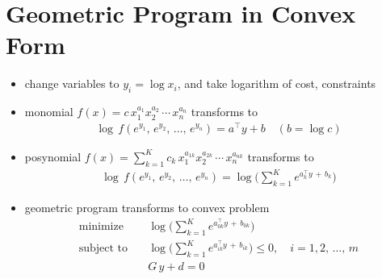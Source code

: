 \documentclass[11pt]{extarticle}
\newcommand{\ds}{\displaystyle}
\theoremstyle{definition}
\begin{document}
\newpage

\section*{Geometric Program in Convex Form}
\begin{itemize}\setlength\itemsep{0em}
  \item change variables to $\ds y_i = \log x_i$, and take logarithm of cost, constraints
  \item monomial $\ds f(x) = c\,x_1^{a_1}x_2^{a_2}\,\cdots\,x_n^{a_n}$ transforms to 
    \begin{align*}
      \log\,f(e^{y_1},\,e^{y_2},\,\ldots,\,e^{y_n}) = a^\top y + b\quad(b = \log c)
    \end{align*}
    \vspace{-5mm}
  \item posynomial $\ds f(x) = \sum_{k = 1}^K c_k\,x_1^{a_{1k}}x_2^{a_{2k}}\,\cdots\, x_n^{a_{nk}}$ transforms to 
    \vspace{-5mm}
    \begin{align*}
      \log\,f(e^{y_1},\,e^{y_2},\,\ldots,\,e^{y_n}) = \log\bigg(\sum_{k = 1}^K e^{a_k^\top y \,+\, b_k}\bigg)
    \end{align*}
    \vspace{-5mm}
  \item geometric program transforms to convex problem
    \vspace{-3mm}
    \begin{align*}
      \text{minimize}\quad & \log\bigg(\sum_{k = 1}^K e^{a_{0k}^\top y \,+\, b_{0k}}\bigg) \\
      \text{subject to}\quad & \log\bigg(\sum_{k = 1}^K e^{a_{ik}^\top y\,+\,b_{ik}}\bigg)\leqslant 0, \quad i = 1, 2,\,\ldots,\,m \\
      \qquad\qquad & G\,y + d = 0
    \end{align*}
    \vspace{-12mm}
\end{itemize}
\end{document}
